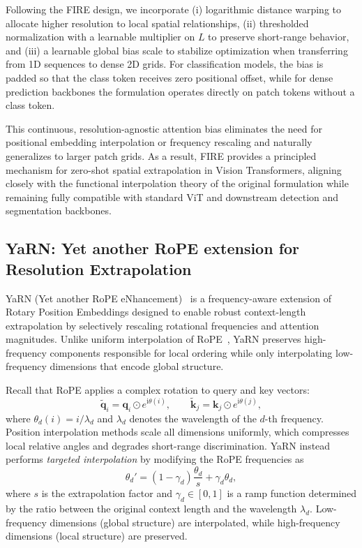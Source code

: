 Following the FIRE design, we incorporate (i) logarithmic distance warping to allocate higher resolution to local spatial relationships, (ii) thresholded normalization with a learnable multiplier on $L$ to preserve short-range behavior, and (iii) a learnable global bias scale to stabilize optimization when transferring from 1D sequences to dense 2D grids. For classification models, the bias is padded so that the class token receives zero positional offset, while for dense prediction backbones the formulation operates directly on patch tokens without a class token.

This continuous, resolution-agnostic attention bias eliminates the need for positional embedding interpolation or frequency rescaling and naturally generalizes to larger patch grids. As a result, FIRE provides a principled mechanism for zero-shot spatial extrapolation in Vision Transformers, aligning closely with the functional interpolation theory of the original formulation while remaining fully compatible with standard ViT and downstream detection and segmentation backbones.



\subsection{YaRN: Yet another RoPE extension for Resolution Extrapolation}

YaRN (Yet another RoPE eNhancement)~\cite{peng2024yarn} is a frequency-aware extension of Rotary Position Embeddings designed to enable robust context-length extrapolation by selectively rescaling rotational frequencies and attention magnitudes. Unlike uniform interpolation of RoPE~\cite{chen2024extending}, YaRN preserves high-frequency components responsible for local ordering while only interpolating low-frequency dimensions that encode global structure.

Recall that RoPE applies a complex rotation to query and key vectors:
\begin{equation}
\tilde{\mathbf{q}}_i = \mathbf{q}_i \odot e^{\mathrm{i}\theta(i)}, \qquad
\tilde{\mathbf{k}}_j = \mathbf{k}_j \odot e^{\mathrm{i}\theta(j)},
\end{equation}
where $\theta_d(i) = i / \lambda_d$ and $\lambda_d$ denotes the wavelength of the $d$-th frequency. Position interpolation methods scale all dimensions uniformly, which compresses local relative angles and degrades short-range discrimination. YaRN instead performs \emph{targeted interpolation} by modifying the RoPE frequencies as
\begin{equation}
\theta_d' = (1-\gamma_d)\frac{\theta_d}{s} + \gamma_d \theta_d,
\end{equation}
where $s$ is the extrapolation factor and $\gamma_d \in [0,1]$ is a ramp function determined by the ratio between the original context length and the wavelength $\lambda_d$. Low-frequency dimensions (global structure) are interpolated, while high-frequency dimensions (local structure) are preserved.

